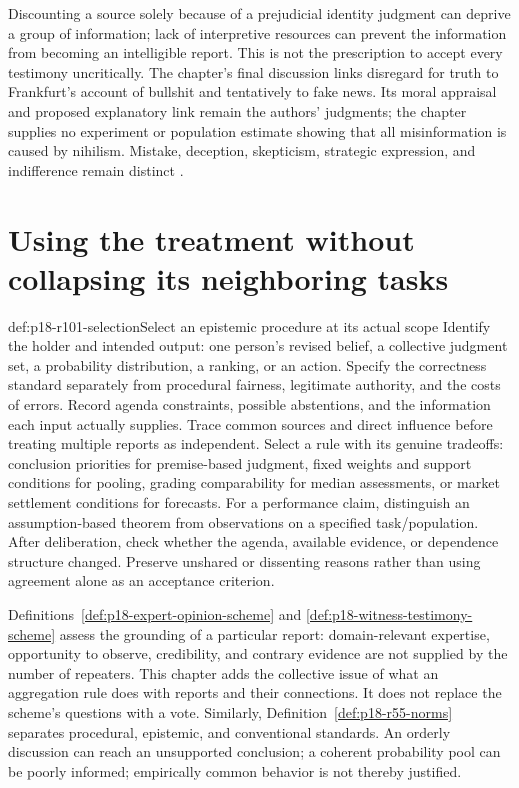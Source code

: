 Discounting a source solely because of a prejudicial identity judgment
can deprive a group of information; lack of interpretive resources can
prevent the information from becoming an intelligible report. This is
not the prescription to accept every testimony uncritically. The
chapter's final discussion links disregard for truth to Frankfurt's
account of bullshit and tentatively to fake news. Its moral appraisal
and proposed explanatory link remain the authors' judgments; the
chapter supplies no experiment or population estimate showing that
all misinformation is caused by nihilism. Mistake, deception,
skepticism, strategic expression, and indifference remain distinct
\parencite[p.~586]{DietrichSpiekermann2021Social}.

\section{Using the treatment without collapsing its neighboring tasks}
\label{sec:p18-r101-use}

\begin{hbmethod}{def:p18-r101-selection}{Select an epistemic procedure at its actual scope}
Identify the holder and intended output: one person's revised belief,
a collective judgment set, a probability distribution, a ranking, or
an action. Specify the correctness standard separately from procedural
fairness, legitimate authority, and the costs of errors. Record agenda
constraints, possible abstentions, and the information each input
actually supplies. Trace common sources and direct influence before
treating multiple reports as independent. Select a rule with its genuine
tradeoffs: conclusion priorities for premise-based judgment, fixed
weights and support conditions for pooling, grading comparability for
median assessments, or market settlement conditions for forecasts.
For a performance claim, distinguish an assumption-based theorem from
observations on a specified task/population. After deliberation, check
whether the agenda, available evidence, or dependence structure changed.
Preserve unshared or dissenting reasons rather than using agreement alone
as an acceptance criterion.
\end{hbmethod}

Definitions~\ref{def:p18-expert-opinion-scheme} and
\ref{def:p18-witness-testimony-scheme} assess the grounding of a
particular report: domain-relevant expertise, opportunity to observe,
credibility, and contrary evidence are not supplied by the number of
repeaters. This chapter adds the collective issue of what an aggregation
rule does with reports and their connections. It does not replace the
scheme's questions with a vote. Similarly,
Definition~\ref{def:p18-r55-norms} separates procedural, epistemic,
and conventional standards. An orderly discussion can reach an
unsupported conclusion; a coherent probability pool can be poorly
informed; empirically common behavior is not thereby justified.

